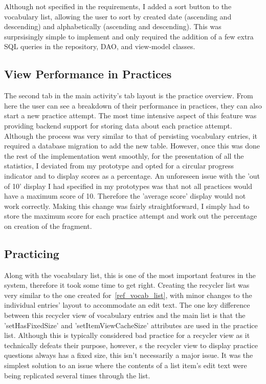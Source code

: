 \documentclass[runningheads]{llncs}
\begin{document}
	Although not specified in the requirements, I added a sort button to the vocabulary list, allowing the user to sort by created date (ascending and descending) and alphabetically (ascending and descending). This was surprsisingly simple to implement and only required the addition of a few extra SQL queries in the repository, DAO, and view-model classes.
	\subsection{View Performance in Practices}
	The second tab in the main activity's tab layout is the practice overview. From here the user can see a breakdown of their performance in practices, they can also start a new practice attempt. The most time intensive aspect of this feature was providing backend support for storing data about each practice attempt. Although the process was very similar to that of persisting vocabulary entries, it required a database migration to add the new table. However, once this was done the rest of the implementation went smoothly, for the presentation of all the statistics, I deviated from my prototype and opted for a circular progress indicator and to display scores as a percentage. An unforeseen issue with the 'out of 10' display I had specified in my prototypes was that not all practices would have a maximum score of 10. Therefore the 'average score' display would not work correctly. Making this change was fairly straightforward, I simply had to store the maximum score for each practice attempt and work out the percentage on creation of the fragment.
	\subsection{Practicing}
	Along with the vocabulary list, this is one of the most important features in the system, therefore it took some time to get right. Creating the recycler list was very similar to the one created for~\ref{ref_vocab_list}, with minor changes to the individual entries' layout to accommodate an edit text. The one key difference between this recycler view of vocabulary entries and the main list is that the 'setHasFixedSize' and 'setItemViewCacheSize' attributes are used in the practice list. Although this is typically considered bad practice for a recycler view as it technically defeats their purpose, however, s the recycler view to display practice questions always has a fixed size, this isn't necessarily a major issue. It was the simplest solution to an issue where the contents of a list item's edit text were being replicated several times through the list.
	
\end{document}
